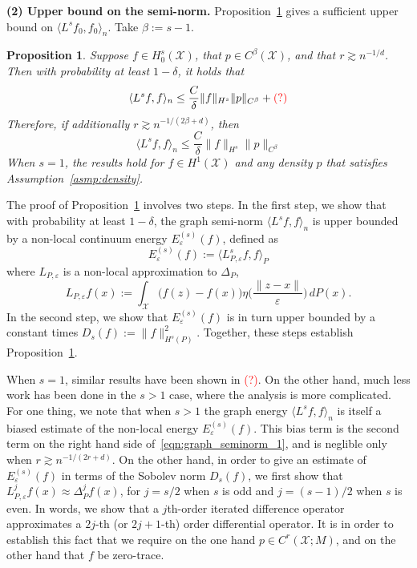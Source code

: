\documentclass{article}
\newcommand{\1}{\mathbf{1}}
\newcommand{\mc}[1]{\mathcal{#1}}
\newcommand{\dotp}[2]{\langle #1, #2 \rangle}
\theoremstyle{alden}
\theoremstyle{aldenthm}
\newtheorem{proposition}{Proposition}
\theoremstyle{definition}
\theoremstyle{remark}
\begin{document}
\textbf{(2) Upper bound on the semi-norm. } Proposition~\ref{prop:graph_seminorm} gives a sufficient upper bound on $\dotp{L^s f_0}{f_0}_n$. Take $\beta := s - 1$. 
\begin{proposition}
	\label{prop:graph_seminorm} 
	Suppose $f \in H_0^s(\mc{X})$, that $p \in C^{\beta}(\mc{X})$, and that $r \gtrsim n^{-1/d}$. Then with probability at least $1 - \delta$, it holds that 
	\begin{equation}
	\label{eqn:graph_seminorm_1}
	\dotp{L^s f}{f}_n \leq \frac{C}{\delta} \|f\|_{H^s} \|p\|_{C^{\beta}} + \textcolor{red}{(?)}
	\end{equation}
	Therefore, if additionally $r \gtrsim n^{-1/(2\beta + d)}$, then 
	\begin{equation}
	\label{eqn:graph_seminorm_2}
	\dotp{L^s f}{f}_n \leq \frac{C}{\delta} \|f\|_{H^s} \|p\|_{C^{\beta}}
	\end{equation}
	When $s = 1$, the results hold for $f \in H^1(\mc{X})$ and any density $p$ that satisfies Assumption~\ref{asmp:density}.
\end{proposition}
The proof of Proposition~\ref{prop:graph_seminorm} involves two steps. In the first step, we show that with probability at least $1 - \delta$, the graph semi-norm $\dotp{L^s f}{f}_n$ is upper bounded by a non-local continuum energy $E_{\varepsilon}^{(s)}(f)$, defined as
\begin{equation*}
E_{\varepsilon}^{(s)}(f) := \dotp{L_{P,\varepsilon}^sf}{f}_{P}
\end{equation*}
where $L_{P,\varepsilon}$ is a non-local approximation to $\Delta_P$, 
\begin{equation*}
L_{P,\varepsilon}f(x) := \int_{\mc{X}}\bigl(f(z) - f(x)\bigr) \eta\biggl(\frac{\|z - x\|}{\varepsilon}\biggr) \,dP(x).
\end{equation*}
In the second step, we show that $E_{\varepsilon}^{(s)}(f)$ is in turn upper bounded by a constant times $D_s(f) := \|f\|_{H^s(P)}^2$. Together, these steps establish Proposition~\ref{prop:graph_seminorm}.

When $s = 1$, similar results have been shown in \textcolor{red}{(?)}. On the other hand, much less work has been done in the $s > 1$ case, where the analysis is more complicated. For one thing, we note that when $s > 1$ the graph energy $\dotp{L^s f}{f}_n$ is itself a biased estimate of the non-local energy $E_{\varepsilon}^{(s)}(f)$. This bias term is the second term on the right hand side of~\eqref{eqn:graph_seminorm_1}, and is neglible only when $r \gtrsim n^{-1/(2r + d)}$. On the other hand, in order to give an estimate of $E_{\varepsilon}^{(s)}(f)$ in terms of the Sobolev norm $D_s(f)$, we first show that $L_{P,\varepsilon}^jf(x) \approx \Delta_P^jf(x)$, for $j = s/2$ when $s$ is odd and $j = (s - 1)/2$ when $s$ is even. In words, we show that a $j$th-order iterated difference operator approximates a $2j$-th (or $2j + 1$-th) order differential operator.  It is in order to establish this fact that we require on the one hand $p \in C^{r}(\mc{X};M)$, and on the other hand that $f$ be zero-trace.
\end{document}
